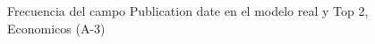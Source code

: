 \begin{figure}[H]
    \centering
    
    \caption{Frecuencia del campo Publication date en el modelo real y Top 2, Economicos (A-3)}
    \label{frecuency-Publication Date-top2}
\end{figure}